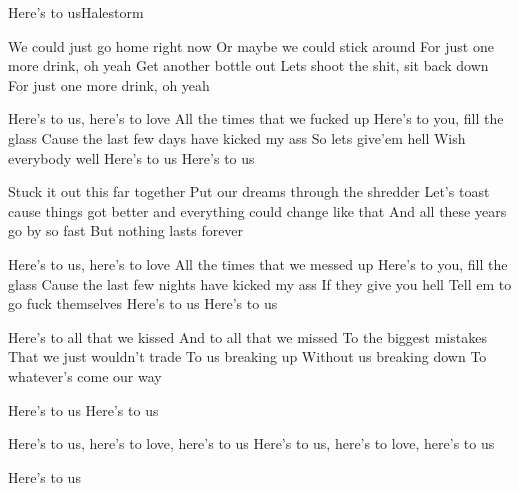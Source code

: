 \documentclass[a4paper,11pt,french]{article}
\begin{document}
\begin{Song}{Here's to us}{Halestorm}
\begin{multicols}{2}

\begin{Verse}
We could just go home right now
Or maybe we could stick around
For just one more drink, oh yeah
Get another bottle out
Lets shoot the shit, sit back down
For just one more drink, oh yeah
\end{Verse}
\espaceInterStrophe

\begin{Chorus}
Here's to us, here's to love
All the times that we fucked up
Here's to you, fill the glass
Cause the last few days have kicked my ass
So lets give'em hell
Wish everybody well
Here's to us
Here's to us
\end{Chorus}
\espaceInterStrophe

\begin{Verse}
Stuck it out this far together
Put our dreams through the shredder
Let’s toast cause things got better
and everything could change like that
And all these years go by so fast
But nothing lasts forever
\end{Verse}
\vfill
\columnbreak

\begin{Chorus}
Here's to us, here's to love
All the times that we messed up
Here's to you, fill the glass
Cause the last few nights have kicked my ass
If they give you hell
Tell em to go fuck themselves
Here's to us
Here's to us
\end{Chorus}
\espaceInterStrophe

\begin{Bridge}
Here's to all that we kissed
And to all that we missed
To the biggest mistakes
That we just wouldn’t trade
To us breaking up
Without us breaking down
To whatever's come our way
\end{Bridge}
\espaceInterStrophe

\tochorus[1]

\tochorus[2]

\begin{Chorus}
Here's to us
Here's to us

Here’s to us, here’s to love, here’s to us 
Here’s to us, here’s to love, here’s to us 

Here’s to us
\end{Chorus}

\end{multicols}


\end{Song}
\end{document}

